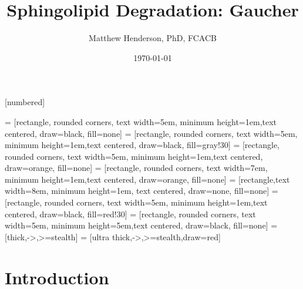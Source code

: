 \documentclass[presentation, smaller]{beamer}
\author{Matthew Henderson, PhD, FCACB}
\date{\today}
\title{Sphingolipid Degradation: Gaucher}
\institute[NSO]{Newborn Screening Ontario | The University of Ottawa}
\begin{document}
\maketitle

\vspace{220pt}
\beamertemplatenavigationsymbolsempty
{}[numbered]

 = [rectangle, rounded corners, text width=5em, minimum height=1em,text centered, draw=black, fill=none]
 = [rectangle, rounded corners, text width=5em, minimum height=1em,text centered, draw=black, fill=gray!30]
 = [rectangle, rounded corners, text width=5em, minimum height=1em,text centered, draw=orange, fill=none]
 = [rectangle, rounded corners, text width=7em, minimum height=1em,text centered, draw=orange, fill=none]
 = [rectangle,text width=8em, minimum height=1em, text centered, draw=none, fill=none]
 = [rectangle, rounded corners, text width=5em, minimum height=1em,text centered, draw=black, fill=red!30]
 = [rectangle, rounded corners, text width=5em, minimum height=5em,text centered, draw=black, fill=none]
 = [thick,->,>=stealth]
 = [ultra thick,->,>=stealth,draw=red]

\section{Introduction}
\label{sec:orgheadline6}
\end{document}
